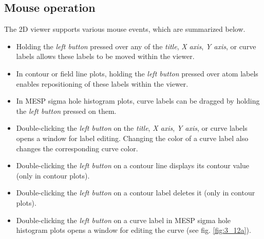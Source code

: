 \documentclass[10pt]{article}
\begin{document}

\subsection{Mouse operation\label{sec:3.10}}

The 2D viewer supports various mouse events,  
which are summarized below.  

\begin{itemize}
\item Holding the {\it left button} pressed over any of the {\it title},  
{\it X axis}, {\it Y axis}, or curve labels allows these labels  
to be moved within the viewer.  

\item In contour or field line plots, holding the {\it left button} pressed over  
atom labels enables repositioning of these labels within the viewer.  

\item In MESP sigma hole histogram plots, curve labels can be dragged  
by holding the {\it left button} pressed on them.  

\item Double-clicking the {\it left button} on the {\it title}, {\it X axis},  
{\it Y axis}, or curve labels opens a window for label editing.  
Changing the color of a curve label also changes the corresponding curve color.  

\item Double-clicking the {\it left button} on a contour line  
displays its contour value (only in contour plots).  

\item Double-clicking the {\it left button} on a contour label deletes it  
(only in contour plots).  

\item Double-clicking the {\it left button} on a curve label in  
MESP sigma hole histogram plots opens a window for editing the curve  
(see fig. \ref{fig:3_12a}).  


\end{itemize}
\end{document}
